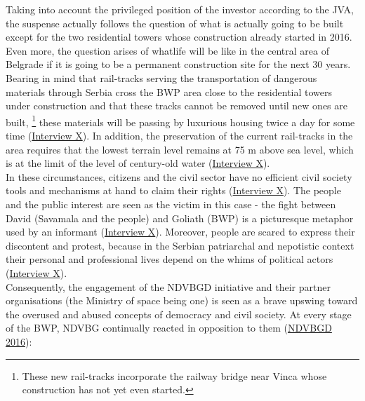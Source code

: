 \documentclass[11pt]{report}
\begin{document}
{{{Taking into account the privileged position of the investor according to the JVA, the suspense actually follows the question of what is actually going to be built except for the two residential towers whose construction  already started in 2016. Even more, the question arises of whatlife will be like in the central area of Belgrade if it is going to be a permanent construction site for the next 30 years.\\

Bearing in mind that rail-tracks serving the transportation of dangerous materials through Serbia cross the BWP area close to the residential towers under construction and that these tracks cannot be removed until new ones are built,
\footnote{These new rail-tracks incorporate the railway bridge near Vinca whose construction has not yet even started.}
these materials will be passing by luxurious housing twice a day for some time 
(\href{InterviewX}{Interview X}).
In addition, the  preservation of the current rail-tracks in the area requires that the lowest terrain level remains at 75 m above sea level, which is at the limit of the level of century-old water (\href{InterviewX}{Interview X}).
\\

In these circumstances, citizens and the civil sector have no efficient civil society tools and mechanisms at hand to claim their rights (\href{InterviewX}{Interview X}).
The people and the public interest are seen as the victim in this case - the fight between David (Savamala and the people) and Goliath (BWP) is a picturesque metaphor used by an informant 
(\href{InterviewX}{Interview X}).
Moreover, people are scared to express their discontent and protest, because in the Serbian patriarchal and nepotistic context their personal and professional lives depend on the whims of political actors (\href{InterviewX}{Interview X}).
\\

Consequently, the engagement of the NDVBGD initiative and their partner organisations (the Ministry of space being one) is seen as a brave upswing toward the overused and abused concepts of democracy and civil society. At every stage of the BWP, NDVBG continually reacted in opposition to them  (\href{NDVBGD}{NDVBGD 2016}):

\begin{enumerate}


\end{enumerate}}}}
\end{document}
